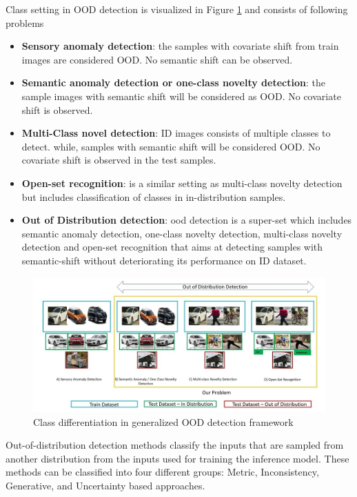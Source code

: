     Class setting in OOD detection is visualized in Figure \ref{fig:OOD_classes} and consists of following problems
    \begin{itemize}
        \item \textbf{Sensory anomaly detection}: the samples with covariate shift from train images are considered OOD. No semantic shift can be observed. 
        \item \textbf{Semantic anomaly detection or one-class novelty detection}: the sample images with semantic shift will be considered as OOD. No covariate shift is observed. 
        \item \textbf{Multi-Class novel detection}: ID images consists of multiple classes to detect. while, samples with semantic shift will be considered OOD. No covariate shift is observed in the test samples. 
        \item \textbf{Open-set recognition}: is a similar setting as multi-class novelty detection but includes classification of classes in in-distribution samples. 
        \item \textbf{Out of Distribution detection}:  \acrshort{ood} detection is a super-set which includes semantic anomaly detection, one-class novelty detection, multi-class novelty detection and open-set recognition that aims at detecting samples with semantic-shift without deteriorating its performance on ID dataset.
    \end{itemize}
    
    \begin{figure}[!htbp]
        \centering
        \includegraphics[scale=0.35]{images/OOD_vs_Non-OOD.jpg}
        \caption[\acrlong{ood} detection problem setting]{Class differentiation in generalized OOD detection framework}
        \label{fig:OOD_classes}
    \end{figure}
    
    Out-of-distribution detection methods classify the inputs that are sampled from another distribution from the inputs used for training the inference model. These methods can be classified into four different groups: Metric, Inconsistency, Generative, and Uncertainty based approaches.
